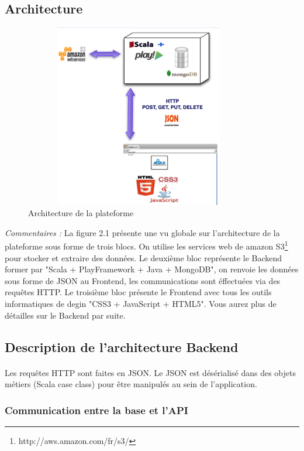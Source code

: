 \subsection{Architecture}
\begin{figure}[H]
        \centering
                \centering
                \includegraphics[width=10cm,height=8cm]{architectureStample.png}
                \caption{Architecture de la plateforme}
                \label{fig:Architecture de la plateforme}
       
\end{figure}
\textit{Commentaires : }
La figure 2.1 présente une vu globale sur l'architecture de la plateforme sous forme de trois blocs. On utilise les services web de amazon S3\footnote{http://aws.amazon.com/fr/s3/} pour stocker et extraire des données.
Le deuxième bloc représente le Backend former par "Scala + PlayFramework + Java + MongoDB", on renvoie les données sous forme de JSON au Frontend, les communications sont éffectuées via des requêtes HTTP.
Le troisième bloc présente le Frontend avec tous les outils informatiques de degin "CSS3 + JavaScript + HTML5". Vous aurez plus de détailles sur le Backend par suite. 
\subsection{Description de l'architecture Backend}
\paragraph{}
Les requêtes HTTP sont faites en JSON.
Le JSON est désérialisé dans des objets métiers 
(Scala case class) pour être manipulés au sein de l'application.
\subsubsection{Communication entre la base et l'API}
